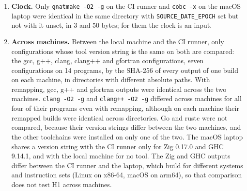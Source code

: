 \documentclass[10pt,letterpaper]{article}
\newcounter{none}
\begin{document}
\begin{enumerate}
  two \texttt{.ali} files; and the Julia run, whose remapped run differs
  in 146 bytes of one LLVM IR file with no copy of the build directory
  left. In GOPATH mode with the import path declared, the remapped
  builds were identical across directories on both Linux machines. On
  the macOS laptop, remapping removed no copy of the build directory
  from the \texttt{-g} builds of C, C++, Fortran and Rust: three copies
  are counted in each program's outputs with and without remapping, and
  the differing byte counts with remapping are within one byte of those
  without. Go's GOPATH mode differed after remapping in 119 and 120
  bytes at equal size with no copy of the build directory left,
  \texttt{ocamlopt\ -\allowbreak{}g} in 669 bytes with one copy, and the Julia run in
  114 bytes with none; Go in module mode, and in GOPATH mode with the
  import path declared, was identical across directories when remapped.
\item
  \textbf{Clock.} Only \texttt{gnatmake\ -\allowbreak{}O2\ -\allowbreak{}g} on the CI runner and
  \texttt{cobc\ -x} on the macOS laptop were identical in the same
  directory with \texttt{SOURCE\_\allowbreak{}DATE\_\allowbreak{}EPOCH} set but not with it unset,
  in 3 and 50 bytes; for them the clock is an input.
\item
  \textbf{Across machines.} Between the local machine and the CI runner,
  only configurations whose tool version string is the same on both are
  compared: the gcc, g++, clang, clang++ and gfortran configurations,
  seven configurations on 14 programs, by the SHA-256 of every output of
  one build on each machine, in directories with different absolute
  paths. With remapping, gcc, g++ and gfortran outputs were identical
  across the two machines. \texttt{clang\ -\allowbreak{}O2\ -\allowbreak{}g} and
  \texttt{clang++\ -\allowbreak{}O2\ -\allowbreak{}g} differed across machines for all four of
  their programs even with remapping, although on each machine their
  remapped builds were identical across directories. Go and rustc were
  not compared, because their version strings differ between the two
  machines, and the other toolchains were installed on only one of the
  two. The macOS laptop shares a version string with the CI runner only
  for Zig 0.17.0 and GHC 9.14.1, and with the local machine for no tool.
  The Zig and GHC outputs differ between the CI runner and the laptop,
  which build for different systems and instruction sets (Linux on
  x86-64, macOS on arm64), so that comparison does not test H1 across
  machines.
\end{enumerate}
\end{document}
